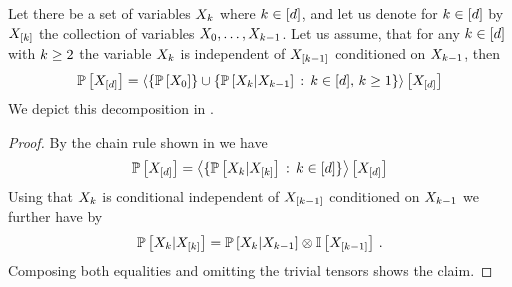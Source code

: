 \begin{theorem}
    \label{the:MarkovChain}
    Let there be a set of variables $X_{k}$ where $k\in[d]$, and let us denote for $k\in[d]$ by $X_{[k]}$ the collection of variables $X_{0},\ldots,X_{k-1}$.
    Let us assume, that for any $k\in[d]$ with $k\geq2$ the variable $X_{k}$ is independent of $X_{[k-1]}$ conditioned on $X_{k-1}$, then
    \begin{align*}
        \mathbb{P}\left[X_{[d]}\right]
        = \left\langle \{\mathbb{P}\left[X_{0}\right]\} \cup \{\mathbb{P}\left[X_{k}|X_{k-1}\right]\,:\,k\in[d], \, k\geq1\}\right\rangle \left[ X_{[d]} \right]
    \end{align*}
    We depict this decomposition in .
\end{theorem}
\begin{proof}
    By the chain rule shown in  we have
    \begin{align*}
        \mathbb{P}\left[X_{[d]}\right]
        = \left\langle 
            \{ \mathbb{P}\left[X_{k}|X_{[k]}\right] \,:\, k\in[d] \}
        \right\rangle \left[ X_{[d]} \right]
    \end{align*}
    Using that $X_{k}$ is conditional independent of $X_{[k-1]}$ conditioned on $X_{k-1}$ we further have by 
    \begin{align*}
        \mathbb{P}\left[X_{k}|X_{[k]}\right]
        = \mathbb{P}\left[X_{k}|X_{k-1}\right] \otimes \mathbb{I}\left[X_{[k-1]}\right] \, .
    \end{align*}
    Composing both equalities and omitting the trivial tensors shows the claim.
\end{proof}

